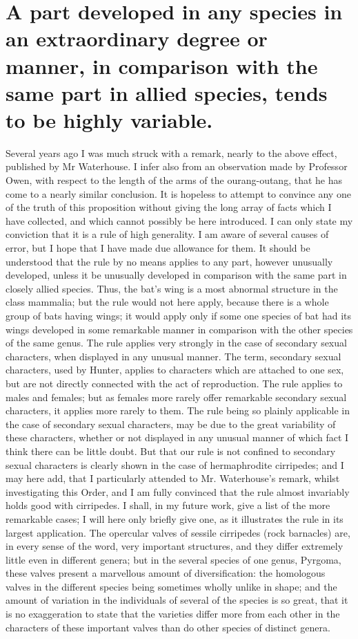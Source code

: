 \section{A part developed in any species in an extraordinary degree or manner, in comparison with the same part in allied species, tends to be highly variable.}
\indent Several years ago I was much struck with a remark, nearly to the above effect, published by Mr Waterhouse. I infer also from an observation made by Professor Owen, with respect to the length of the arms of the ourang-outang, that he has come to a nearly similar conclusion. It is hopeless to attempt to convince any one of the truth of this proposition without giving the long array of facts which I have collected, and which cannot possibly be here introduced. I can only state my conviction that it is a rule of high generality. I am aware of several causes of error, but I hope that I have made due allowance for them. It should be understood that the rule by no means applies to any part, however unusually developed, unless it be unusually developed in comparison with the same part in closely allied species. Thus, the bat's wing is a most abnormal structure in the class mammalia; but the rule would not here apply, because there is a whole group of bats having wings; it would apply only if some one species of bat had its wings developed in some remarkable manner in comparison with the other species of the same genus. The rule applies very strongly in the case of secondary sexual characters, when displayed in any unusual manner. The term, secondary sexual characters, used by Hunter, applies to characters which are attached to one sex, but are not directly connected with the act of reproduction. The rule applies to males and females; but as females more rarely offer remarkable secondary sexual characters, it applies more rarely to them. The rule being so plainly applicable in the case of secondary sexual characters, may be due to the great variability of these characters, whether or not displayed in any unusual manner of which fact I think there can be little doubt. But that our rule is not confined to secondary sexual characters is clearly shown in the case of hermaphrodite cirripedes; and I may here add, that I particularly attended to Mr. Waterhouse's remark, whilst investigating this Order, and I am fully convinced that the rule almost invariably holds good with cirripedes. I shall, in my future work, give a list of the more remarkable cases; I will here only briefly give one, as it illustrates the rule in its largest application. The opercular valves of sessile cirripedes (rock barnacles) are, in every sense of the word, very important structures, and they differ extremely little even in different genera; but in the several species of one genus, Pyrgoma, these valves present a marvellous amount of diversification: the homologous valves in the different species being sometimes wholly unlike in shape; and the amount of variation in the individuals of several of the species is so great, that it is no exaggeration to state that the varieties differ more from each other in the characters of these important valves than do other species of distinct genera.\\

